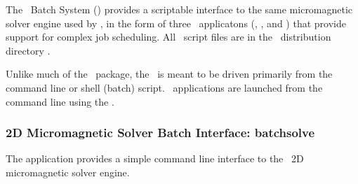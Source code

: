 The \OOMMF\ Batch System (\OBS) provides a scriptable interface
to the same micromagnetic solver engine used by
, in the
form of three \Tcl\ applicatons
(, , and
) that provide support for complex job scheduling.
All \OBS\ script files are in the \OOMMF\ distribution directory
.

Unlike much of the \OOMMF\ package, the \OBS\ is meant to be
driven primarily from the command line or shell (batch) script.
\OBS\ applications are launched from the command line using the
.

\subsubsection{2D Micromagnetic Solver Batch Interface: batchsolve}%
\label{sec:batchsolve}

The application
 provides a simple
command line interface to the \OOMMF\ 2D micromagnetic solver engine.

